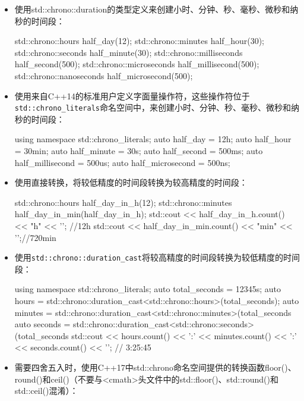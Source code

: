 \begin{itemize}
\item
使用std::chrono::duration的类型定义来创建小时、分钟、秒、毫秒、微秒和纳秒的时间段：

\begin{cpp}
std::chrono::hours        half_day(12);
std::chrono::minutes      half_hour(30);
std::chrono::seconds      half_minute(30);
std::chrono::milliseconds half_second(500);
std::chrono::microseconds half_millisecond(500);
std::chrono::nanoseconds  half_microsecond(500);
\end{cpp}

\item
使用来自C++14的标准用户定义字面量操作符，这些操作符位于\verb|std::chrono_literals|命名空间中，来创建小时、分钟、秒、毫秒、微秒和纳秒的时间段：

\begin{cpp}
using namespace std::chrono_literals;
auto half_day         = 12h;
auto half_hour        = 30min;
auto half_minute      = 30s;
auto half_second      = 500ms;
auto half_millisecond = 500us;
auto half_microsecond = 500ns;
\end{cpp}

\item
使用直接转换，将较低精度的时间段转换为较高精度的时间段：

\begin{cpp}
std::chrono::hours half_day_in_h(12);
std::chrono::minutes half_day_in_min(half_day_in_h);
std::cout << half_day_in_h.count() << "h" << '\n';    //12h
std::cout << half_day_in_min.count() << "min" << '\n';//720min
\end{cpp}

\item
使用\verb|std::chrono::duration_cast|将较高精度的时间段转换为较低精度的时间段：

\begin{cpp}
using namespace std::chrono_literals;
auto total_seconds = 12345s;
auto hours =
    std::chrono::duration_cast<std::chrono::hours>(total_seconds);
auto minutes =
    std::chrono::duration_cast<std::chrono::minutes>(total_seconds %
auto seconds =
    std::chrono::duration_cast<std::chrono::seconds>(total_seconds %
std::cout << hours.count()   << ':'
          << minutes.count() << ':'
          << seconds.count() << '\n'; // 3:25:45
\end{cpp}

\item
需要四舍五入时，使用C++17中std::chrono命名空间提供的转换函数floor()、round()和ceil()（不要与<cmath>头文件中的std::floor()、std::round()和std::ceil()混淆）：


\end{itemize}
